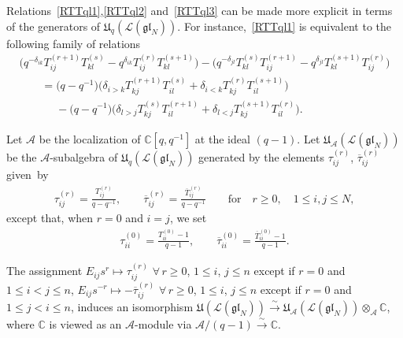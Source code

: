 Relations~\eqref{RTTql1},\eqref{RTTql2} and~\eqref{RTTql3} can be made more explicit in terms of the generators of
$\mathfrak{U}_q(\mathcal{L}(\mathfrak{gl}_N))$.
For instance,~\eqref{RTTql1} is equivalent to the following family of relations
\begin{gather}
\big(q^{-\delta_{ik}} T_{ij}^{(r+1)} T_{kl}^{(s)} - q^{\delta_{ik}}T_{ij}^{(r)} T_{kl}^{(s+1)}\big) - \big(q^{-\delta_{jl}}
T_{kl}^{(s)} T_{ij}^{(r+1)} - q^{\delta_{jl}} T_{kl}^{(s+1)} T_{ij}^{(r)}\big)
\nonumber
\\
\qquad{}
= \big(q-q^{-1}\big) \big(\delta_{i>k} T_{kj}^{(r+1)} T_{il}^{(s)} + \delta_{i<k} T_{kj}^{(r)} T_{il}^{(s+1)}\big)
\nonumber\\
\qquad\phantom{=}
- \big(q-q^{-1}\big)\big(\delta_{l>j} T_{kj}^{(s)} T_{il}^{(r+1)} + \delta_{l<j} T_{kj}^{(s+1)} T_{il}^{(r)}\big).
\label{RTTql12}
\end{gather}

Let $\mathcal{A}$ be the localization of $\mathbb{C}[q,q^{-1}]$ at the ideal $(q-1)$.
Let $\mathfrak{U}_{\mathcal{A}}(\mathcal{L}(\mathfrak{gl}_N))$ be the $\mathcal{A}$-subalgebra of
$\mathfrak{U}_q(\mathcal{L}(\mathfrak{gl}_N))$ generated by the elements $ \tau_{ij}^{(r)}$,
$\overline{\tau}_{ij}^{(r)}$ given~by
\begin{gather*}
\tau_{ij}^{(r)} = \frac{T_{ij}^{(r)}}{q-q^{-1}},
\qquad
\overline{\tau}_{ij}^{(r)} = \frac{\overline{T}_{ij}^{(r)}}{q-q^{-1}}
\qquad\text{for}\quad r\ge 0,\quad 1\le i,j \le N,
\end{gather*}
except that, when $r=0$ and $i=j$, we set
\begin{gather*}
\tau_{ii}^{(0)} = \frac{T_{ii}^{(0)}-1}{q-1}, \qquad \overline{\tau}_{ii}^{(0)} = \frac{\overline{T}_{ii}^{(0)}-1}{q-1}.
\end{gather*}

\begin{theorem}
\label{qlim}
The assignment $E_{ij} s^r \mapsto \tau_{ij}^{(r)}$ $\forall\, r\ge 0$, $1\le i$, $j\le n$ except if $r=0$ and $1\le i<j\le n$,
$E_{ij} s^{-r} \mapsto -\overline{\tau}_{ij}^{(r)}$ $\forall\, r\ge 0$, $1\le i$, $j\le n$ except if $r=0$ and $1\le j<i\le n$,
induces an isomorphism $\mathfrak{U}(\mathcal{L}(\mathfrak{gl}_N)) \stackrel{\sim}{\longrightarrow}
\mathfrak{U}_{\mathcal{A}}(\mathcal{L}(\mathfrak{gl}_N)) \otimes_{\mathcal{A}} \mathbb{C}$, where $\mathbb{C}$
is viewed as an $\mathcal{A}$-module via $\mathcal{A}/(q-1) \stackrel{\sim}{\longrightarrow} \mathbb{C}$.
\end{theorem}

